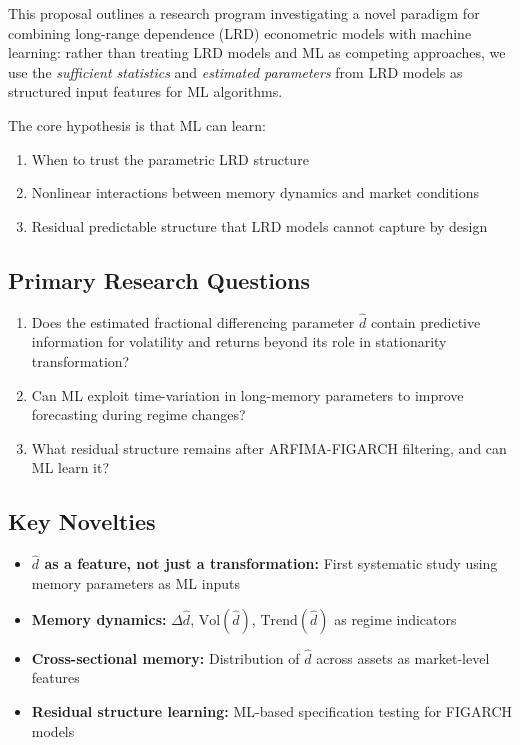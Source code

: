 \documentclass[11pt,a4paper]{article}
\theoremstyle{definition}
\newcommand{\dhat}{\hat{d}}
\begin{document}
This proposal outlines a research program investigating a novel paradigm for combining long-range dependence (LRD) econometric models with machine learning: rather than treating LRD models and ML as competing approaches, we use the \textit{sufficient statistics} and \textit{estimated parameters} from LRD models as structured input features for ML algorithms.

The core hypothesis is that ML can learn:
\begin{enumerate}[label=(\roman*)]
    \item When to trust the parametric LRD structure
    \item Nonlinear interactions between memory dynamics and market conditions
    \item Residual predictable structure that LRD models cannot capture by design
\end{enumerate}

\subsection*{Primary Research Questions}

\begin{enumerate}
    \item Does the estimated fractional differencing parameter $\dhat$ contain predictive information for volatility and returns beyond its role in stationarity transformation?
    \item Can ML exploit time-variation in long-memory parameters to improve forecasting during regime changes?
    \item What residual structure remains after ARFIMA-FIGARCH filtering, and can ML learn it?
\end{enumerate}

\subsection*{Key Novelties}

\begin{itemize}
    \item \textbf{$\dhat$ as a feature, not just a transformation:} First systematic study using memory parameters as ML inputs
    \item \textbf{Memory dynamics:} $\Delta\dhat$, $\text{Vol}(\dhat)$, $\text{Trend}(\dhat)$ as regime indicators
    \item \textbf{Cross-sectional memory:} Distribution of $\dhat$ across assets as market-level features
    \item \textbf{Residual structure learning:} ML-based specification testing for FIGARCH models
\end{itemize}
\end{document}
